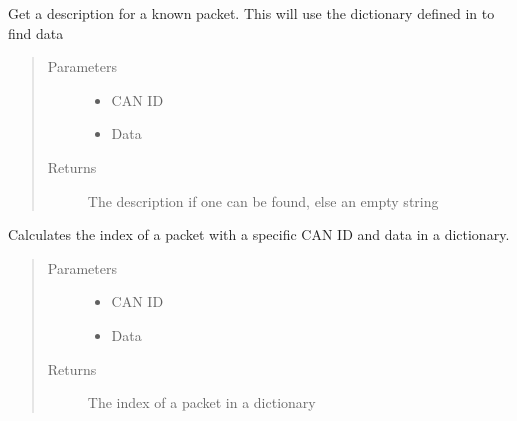 \documentclass[letterpaper,10pt,english]{sphinxmanual}
\begin{document}
\begin{fulllineitems}
\begin{fulllineitems}
\label{\detokenize{src:src.Toolbox.Toolbox.getKnownPacketDescription}}
Get a description for a known packet. This will use the dictionary defined in
 to find data
\begin{quote}\begin{description}
\item[{Parameters}] \leavevmode\begin{itemize}
\item {} 
 \textendash{} CAN ID

\item {} 
 \textendash{} Data

\end{itemize}

\item[{Returns}] \leavevmode
The description if one can be found, else an empty string

\end{description}\end{quote}

\end{fulllineitems}


\begin{fulllineitems}
\label{\detokenize{src:src.Toolbox.Toolbox.getPacketDictIndex}}
Calculates the index of a packet with a specific CAN ID and data in a dictionary.
\begin{quote}\begin{description}
\item[{Parameters}] \leavevmode\begin{itemize}
\item {} 
 \textendash{} CAN ID

\item {} 
 \textendash{} Data

\end{itemize}

\item[{Returns}] \leavevmode
The index of a packet in a dictionary


\end{description}
\end{quote}
\end{fulllineitems}
\end{fulllineitems}
\end{document}
